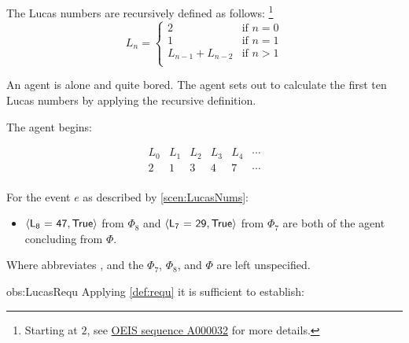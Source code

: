 \begin{note}
  \begin{scenario}%
    \label{scen:LucasNums}%
    The Lucas numbers are recursively defined as follows:%
    \footnote{
      Starting at \(2\), see \hyperlink{cite.OEIS.:aa}{OEIS sequence A000032} for more details.
    }
    \[
      L_{n} = \left\{
        \begin{array}{ll}
          2 & \text{if } n = 0 \\
          1 & \text{if } n = 1 \\
          L_{n-1} + L_{n-2} & \text{if } n > 1 \\
        \end{array}
      \right.
    \]

    An agent is alone and quite bored.
    The agent sets out to calculate the first ten Lucas numbers by applying the recursive definition.

    The agent begins:

    \[
    \begin{array}{cccccc}
      L_{0} & L_{1} & L_{2} & L_{3} & L_{4} & \cdots \\
      \hline
      2 & 1 & 3 & 4 & 7 & \cdots \\
    \end{array}
    \]
  \end{scenario}

  \begin{observation}%
    \label{obs:LucasRequ}%
    For the event \(e\) as described by \autoref{scen:LucasNums}:
    \begin{itemize}
    \item
      \(\pv{\propI{L\textsubscript{8} = 47}}{\valI{True}}\) from \(\Phi_{8}\) and \(\pv{\propI{L\textsubscript{7} = 29}}{\valI{True}}\) from \(\Phi_{7}\) are both  of the agent concluding  from \(\Phi\).
    \end{itemize}
    Where  abbreviates , and the  \(\Phi_{7}\), \(\Phi_{8}\), and \(\Phi\) are left unspecified.
  \end{observation}

  \begin{motivation}{obs:LucasRequ}
    Applying \autoref{def:requ} it is sufficient to establish:


\end{motivation}
\end{note}

